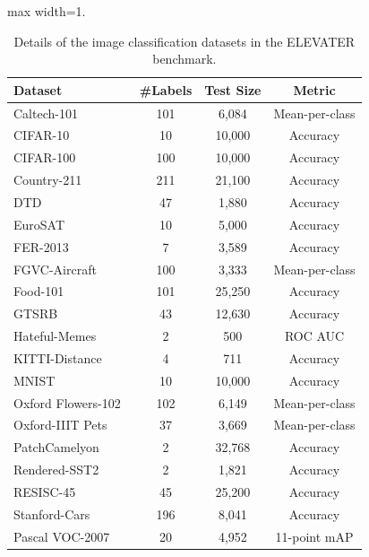 \begin{table}[t]
\center
\small
\vskip 0.15in
\begin{adjustbox}{max width=1.\textwidth}
\begin{tabular}{@{\extracolsep{\fill}}lccc}
\toprule
Dataset & \#Labels & Test Size & Metric \\
\midrule
  Caltech-101~\citep{caltech} & 101 & 6,084 & Mean-per-class  \\
  CIFAR-10~\citep{cifar} & 10 & 10,000 &  Accuracy   \\
  CIFAR-100~\citep{cifar} & 100 & 10,000 & Accuracy   \\
  Country-211~\citep{clip} & 211 & 21,100 & Accuracy   \\
  DTD~\citep{dtd} & 47 & 1,880 & Accuracy  \\
  EuroSAT~\citep{eurosat} & 10 & 5,000 & Accuracy  \\
  FER-2013~\citep{clip} & 7 & 3,589 & Accuracy  \\
  FGVC-Aircraft~\citep{fgvc} & 100 & 3,333 & Mean-per-class \\
  Food-101~\citep{food101} & 101 & 25,250 & Accuracy \\
  GTSRB~\citep{gtsrb} & 43 & 12,630 & Accuracy  \\
  Hateful-Memes~\citep{hateful} & 2  & 500 & ROC AUC \\
  KITTI-Distance~\citep{kitti} & 4 & 711 & Accuracy  \\
  MNIST~\citep{mnist} & 10 & 10,000 & Accuracy \\
  Oxford Flowers-102~\citep{flowers} & 102 & 6,149 & Mean-per-class  \\
  Oxford-IIIT Pets~\cite{pets} & 37 & 3,669 & Mean-per-class \\
  PatchCamelyon~\citep{patchcamelyon} & 2 & 32,768 & Accuracy  \\
  Rendered-SST2~\citep{clip} & 2 & 1,821 & Accuracy  \\
  RESISC-45~\citep{resisc45} & 45 & 25,200 & Accuracy \\
  Stanford-Cars~\citep{stanford_cars} & 196 & 8,041 & Accuracy  \\
  Pascal VOC-2007~\citep{voc} & 20 & 4,952 & 11-point mAP \\
\bottomrule
\end{tabular}
\end{adjustbox}
\caption{Details of the image classification datasets in the ELEVATER benchmark. }
\label{tb:icinw}
\end{table}